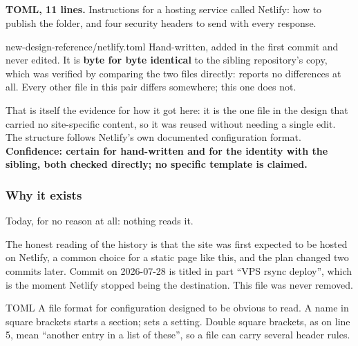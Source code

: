 \subsection{}

\textbf{TOML, 11 lines.} Instructions for a hosting service called Netlify: how to
publish the folder, and four security headers to send with every response.

\begin{provenance}{new-design-reference/netlify.toml}
Hand-written, added in the first commit  and never edited. It is
\textbf{byte for byte identical} to the sibling repository's copy, which was
verified by comparing the two files directly:  reports no differences at
all. Every other file in this pair differs somewhere; this one does not.

That is itself the evidence for how it got here: it is the one file in the design
that carried no site-specific content, so it was reused without needing a single
edit. The structure follows Netlify's own documented configuration format.
\textbf{Confidence: certain for hand-written and for the identity with the sibling,
both checked directly; no specific template is claimed.}
\end{provenance}

\subsubsection*{Why it exists}

Today, for no reason at all: nothing reads it.

The honest reading of the history is that the site was first expected to be hosted
on Netlify, a common choice for a static page like this, and the plan changed two
commits later. Commit  on 2026-07-28 is titled in part ``VPS rsync
deploy'', which is the moment Netlify stopped being the destination. This file was
never removed.

\begin{jargon}{TOML}
A file format for configuration designed to be obvious to read. A name in square
brackets starts a section;  sets a setting. Double square
brackets, as on line 5, mean ``another entry in a list of these'', so a file can
carry several header rules.
\end{jargon}

